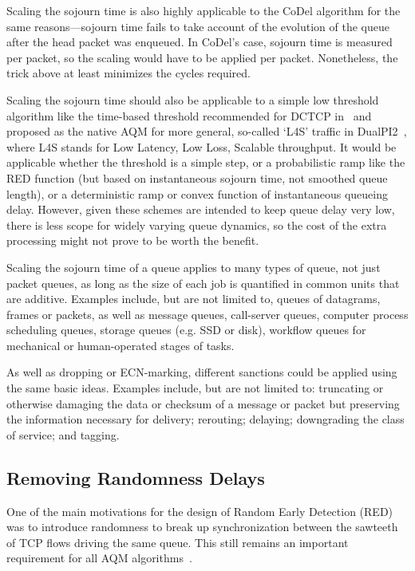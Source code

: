 Scaling the sojourn time is also highly applicable to the CoDel algorithm for the same reasons---sojourn time fails to take account of the evolution of the queue after the head packet was enqueued. In CoDel's case, sojourn time is measured per packet, so the scaling would have to be applied per packet. Nonetheless, the trick above at least minimizes the cycles required.

Scaling the sojourn time should also be applicable to a simple low threshold algorithm like the time-based threshold recommended for DCTCP in~\cite{Bai16:MQ-ECN} and proposed as the native AQM for more general, so-called `L4S' traffic in DualPI2~\cite{Briscoe15e:DualQ-Coupled-AQM_ID}, where L4S stands for Low Latency, Low Loss, Scalable throughput. It would be applicable whether the threshold is a simple step, or a probabilistic ramp like the RED function (but based on instantaneous sojourn time, not smoothed queue length), or a deterministic ramp or convex function of instantaneous queueing delay. However, given these schemes are intended to keep queue delay very low, there is less scope for widely varying queue dynamics, so the cost of the extra processing might not prove to be worth the benefit.

Scaling the sojourn time of a queue applies to many types of queue, not just packet queues, as long as the size of each job is quantified in common units that are additive. Examples include, but are not limited to, queues of datagrams, frames or packets, as well as message queues, call-server queues, computer process scheduling queues, storage queues (e.g. SSD or disk), workflow queues for mechanical or human-operated stages of tasks. 

As well as dropping or ECN-marking, different sanctions could be applied using the same basic ideas. Examples include, but are not limited to: truncating or otherwise damaging the data or checksum of a message or packet but preserving the information necessary for delivery; rerouting; delaying; downgrading the class of service; and tagging.

\subsection{Removing Randomness Delays}\label{sec:rand_delay}

One of the main motivations for the design of Random Early Detection (RED)~\cite{Floyd93:RED} was to introduce randomness to break up synchronization between the sawteeth of TCP flows driving the same queue. This still remains an important requirement for all AQM algorithms~\cite{Baker15:AQM_Recommendations}.

